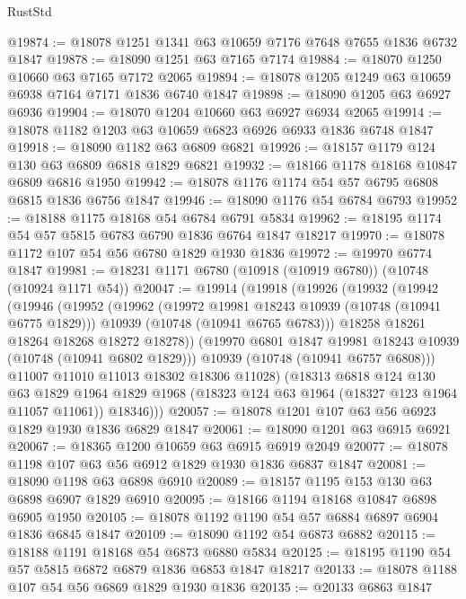 \begin{lexlean}{RustStd}
\begin{coremodule}
{\begin{coremodule}
{{{{{@19874 := @18078 @1251 @1341 @63 @10659 @7176 @7648 @7655 @1836 @6732 @1847
@19878 := @18090 @1251 @63 @7165 @7174
@19884 := @18070 @1250 @10660 @63 @7165 @7172 @2065
@19894 := @18078 @1205 @1249 @63 @10659 @6938 @7164 @7171 @1836 @6740 @1847
@19898 := @18090 @1205 @63 @6927 @6936
@19904 := @18070 @1204 @10660 @63 @6927 @6934 @2065
@19914 := @18078 @1182 @1203 @63 @10659 @6823 @6926 @6933 @1836 @6748 @1847
@19918 := @18090 @1182 @63 @6809 @6821
@19926 := @18157 @1179 @124 @130 @63 @6809 @6818 @1829 @6821
@19932 := @18166 @1178 @18168 @10847 @6809 @6816 @1950
@19942 := @18078 @1176 @1174 @54 @57 @6795 @6808 @6815 @1836 @6756 @1847
@19946 := @18090 @1176 @54 @6784 @6793
@19952 := @18188 @1175 @18168 @54 @6784 @6791 @5834
@19962 := @18195 @1174 @54 @57 @5815 @6783 @6790 @1836 @6764 @1847 @18217
@19970 := @18078 @1172 @107 @54 @56 @6780 @1829 @1930 @1836
@19972 := @19970 @6774 @1847
@19981 := @18231 @1171 @6780 (@10918 (@10919 @6780)) (@10748 (@10924 @1171 @54))
@20047 := @19914
    (@19918
      (@19926
        (@19932
          (@19942
            (@19946
              (@19952
                (@19962
                  (@19972 @19981 @18243 @10939 (@10748 (@10941 @6775 @1829)))
                  @10939
                  (@10748 (@10941 @6765 @6783)))
                @18258
                @18261
                @18264
                @18268
                @18272
                @18278))
            (@19970 @6801 @1847 @19981 @18243 @10939 (@10748 (@10941 @6802 @1829)))
            @10939
            (@10748 (@10941 @6757 @6808)))
          @11007
          @11010
          @11013
          @18302
          @18306
          @11028)
        (@18313
          @6818
          @124
          @130
          @63
          @1829
          @1964
          @1829
          @1968
          (@18323 @124 @63 @1964 (@18327 @123 @1964 @11057 @11061))
          @18346)))
@20057 := @18078 @1201 @107 @63 @56 @6923 @1829 @1930 @1836 @6829 @1847
@20061 := @18090 @1201 @63 @6915 @6921
@20067 := @18365 @1200 @10659 @63 @6915 @6919 @2049
@20077 := @18078 @1198 @107 @63 @56 @6912 @1829 @1930 @1836 @6837 @1847
@20081 := @18090 @1198 @63 @6898 @6910
@20089 := @18157 @1195 @153 @130 @63 @6898 @6907 @1829 @6910
@20095 := @18166 @1194 @18168 @10847 @6898 @6905 @1950
@20105 := @18078 @1192 @1190 @54 @57 @6884 @6897 @6904 @1836 @6845 @1847
@20109 := @18090 @1192 @54 @6873 @6882
@20115 := @18188 @1191 @18168 @54 @6873 @6880 @5834
@20125 := @18195 @1190 @54 @57 @5815 @6872 @6879 @1836 @6853 @1847 @18217
@20133 := @18078 @1188 @107 @54 @56 @6869 @1829 @1930 @1836
@20135 := @20133 @6863 @1847
}}}}}
\end{coremodule}}
\end{coremodule}
\end{lexlean}
